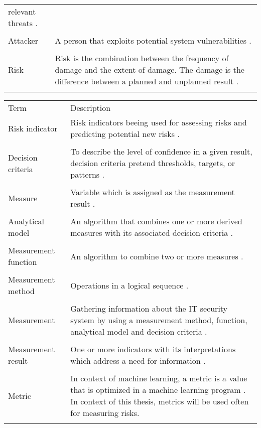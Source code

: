 \begin{center}
\begin{tabular}{ |L{4cm}|L{10cm}|  }
    relevant threats \cite{bsi_glossar_2021}. \\
    & \\
    \hline
    Attacker & A person that exploits potential system vulnerabilities \cite{FIPS1402}. \\
    & \\
    \hline
    Risk & Risk is the combination between the frequency of damage and
    the extent of damage. The damage is the difference between a
    planned and unplanned result \cite{bsi_glossar_2021}. \\
    & \\
    \hline
  \end{tabular}
\end{center}

\newpage

\begin{center}
  \begin{tabular}{ |L{4cm}|L{10cm}|  }
    \hline
     Term & Description \\ [0.5ex]
    Risk indicator & Risk indicators beeing used for assessing risks
    and predicting potential new risks \cite{Saluja2014RiskIF}. \\
    & \\
    \hline
    Decision criteria & To describe the level of confidence in a given result, decision criteria pretend thresholds, targets, or patterns \cite{ISO_27004_2009}. \\
    & \\
    \hline
    Measure & Variable which is assigned as the measurement result \cite{ISO_27004_2009}. \\
    & \\
    \hline
    Analytical model & An algorithm that combines one or more derived measures with its associated decision criteria \cite{ISO_27004_2009}. \\
    & \\
    \hline
    Measurement function & An algorithm to combine two or more measures \cite{ISO_27004_2009}. \\
    & \\
    \hline
    Measurement method & Operations in a logical sequence \cite{ISO_27004_2009}. \\
    & \\
    \hline
    Measurement & Gathering information about the IT security system by using a measurement method, function, analytical model and decision criteria \cite{ISO_27004_2009}. \\
    & \\
    \hline
    Measurement result & One or more indicators with its interpretations which address a need for information \cite{ISO_27004_2009}. \\
    & \\
    \hline
    Metric & In context of machine learning, a metric is a value that is
    optimized  in a machine learning program \cite{google}.
    In context of this thesis, metrics will be used often for
    measuring risks. \\
    & \\
    \hline
  \end{tabular}
\end{center}
